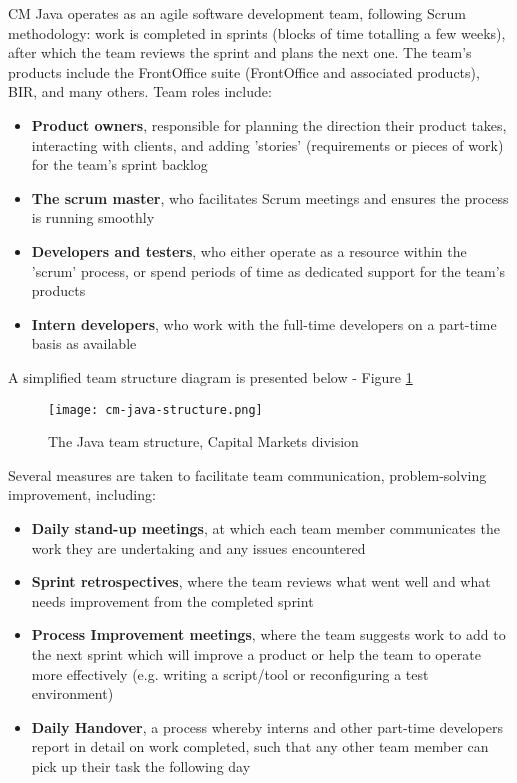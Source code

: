 CM Java operates as an agile software development team, following Scrum methodology: work is completed in sprints (blocks of time totalling a few weeks), after which the team reviews the sprint and plans the next one. The team's products include the FrontOffice suite (FrontOffice and associated products), BIR, and many others. Team roles include: 
\begin{itemize}
\item \textbf{Product owners}, responsible for planning the direction their product takes, interacting with clients, and adding 'stories' (requirements or pieces of work) for the team's sprint backlog
\item \textbf{The scrum master}, who facilitates Scrum meetings and ensures the process is running smoothly
\item \textbf{Developers and testers}, who either operate as a resource within the 'scrum' process, or spend periods of time as dedicated support for the team's products
\item \textbf{Intern developers}, who work with the full-time developers on a part-time basis as available
\end{itemize}

\newpage

A simplified team structure diagram is presented below - Figure \ref{cm_java_structure}

\vspace{0.5cm}
\begin{figure}[ht!]
\centering
\texttt{[image: cm-java-structure.png]}
\caption{The Java team structure, Capital Markets division}
\label{cm_java_structure}
\end{figure}
\vspace{0.5cm}

Several measures are taken to facilitate team communication, problem-solving improvement, including:
\begin{itemize}
\item \textbf{Daily stand-up meetings}, at which each team member communicates the work they are undertaking and any issues encountered
\item \textbf{Sprint retrospectives}, where the team reviews what went well and what needs improvement from the completed sprint
\item \textbf{Process Improvement meetings}, where the team suggests work to add to the next sprint which will improve a product or help the team to operate more effectively (e.g. writing a script/tool or  reconfiguring a test environment)
\item \textbf{Daily Handover}, a process whereby interns and other part-time developers report in detail on work completed, such that any other team member can pick up their task the following day
\end{itemize}


